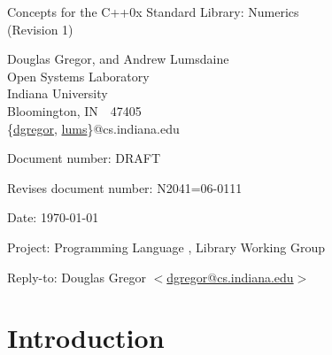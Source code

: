 \documentclass[american,twoside]{book}
\begin{document}
\raggedbottom

\begin{titlepage}
\begin{center}
\huge
Concepts for the C++0x Standard Library: Numerics\\
(Revision 1)

\vspace{0.5in}

\normalsize
Douglas Gregor, and Andrew Lumsdaine \\
Open Systems Laboratory \\
Indiana University \\
Bloomington, IN\ \  47405 \\
\{\href{mailto:dgregor@cs.indiana.edu}{dgregor}, \href{mailto:lums@cs.indiana.edu}{lums}\}@cs.indiana.edu
\end{center}

\vspace{1in}
\par\noindent Document number: DRAFT\vspace{-6pt}
\par\noindent Revises document number: N2041=06-0111\vspace{-6pt}
\par\noindent Date: \today\vspace{-6pt}
\par\noindent Project: Programming Language \Cpp{}, Library Working Group\vspace{-6pt}
\par\noindent Reply-to: Douglas Gregor $<$\href{mailto:dgregor@cs.indiana.edu}{dgregor@cs.indiana.edu}$>$\vspace{-6pt}

\section*{Introduction}
\end{titlepage}

\pagestyle{fancy}
\fancyhead[LE,RO]{\textbf{\rightmark}}
\fancyhead[RE]{\textbf{\leftmark\hspace{1em}\thepage}}
\fancyhead[LO]{\textbf{\thepage\hspace{1em}\leftmark}}

\end{document}
